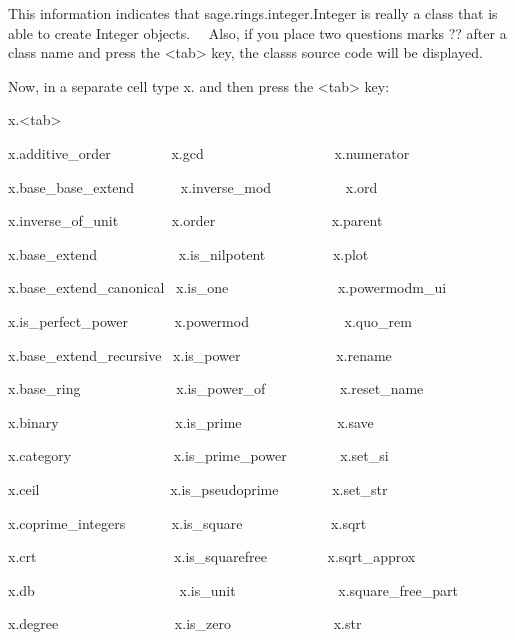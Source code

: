 \documentclass[12pt,twoside]{book}
\begin{document}
\bigskip

This information indicates that sage.rings.integer.Integer is really a
class that is able to create Integer objects. \ \ Also, if you place
two questions marks {\textquotesingle}??{\textquotesingle} after a
class name and press the {\textless}tab{\textgreater} key, the
class{\textquotesingle}s source code will be displayed.


\bigskip

Now, in a separate cell type x. and then press the
{\textless}tab{\textgreater} key:


\bigskip

x.{\textless}tab{\textgreater}

{\textbar}

x.additive\_order \ \ \ \ \ \ \ \ x.gcd
\ \ \ \ \ \ \ \ \ \ \ \ \ \ \ \ \ \ x.numerator

x.base\_base\_extend \ \ \ \ \ \ x.inverse\_mod
\ \ \ \ \ \ \ \ \ \ x.ord

x.inverse\_of\_unit \ \ \ \ \ \ \ x.order
\ \ \ \ \ \ \ \ \ \ \ \ \ \ \ \ x.parent

x.base\_extend \ \ \ \ \ \ \ \ \ \ \ x.is\_nilpotent
\ \ \ \ \ \ \ \ \ x.plot

x.base\_extend\_canonical \ x.is\_one
\ \ \ \ \ \ \ \ \ \ \ \ \ \ \ x.powermodm\_ui

x.is\_perfect\_power \ \ \ \ \ \ x.powermod
\ \ \ \ \ \ \ \ \ \ \ \ \ x.quo\_rem

x.base\_extend\_recursive \ x.is\_power
\ \ \ \ \ \ \ \ \ \ \ \ \ x.rename

x.base\_ring \ \ \ \ \ \ \ \ \ \ \ \ \ x.is\_power\_of
\ \ \ \ \ \ \ \ \ \ x.reset\_name

x.binary \ \ \ \ \ \ \ \ \ \ \ \ \ \ \ \ x.is\_prime
\ \ \ \ \ \ \ \ \ \ \ \ \ x.save

x.category \ \ \ \ \ \ \ \ \ \ \ \ \ \ x.is\_prime\_power
\ \ \ \ \ \ \ x.set\_si

x.ceil \ \ \ \ \ \ \ \ \ \ \ \ \ \ \ \ \ \ x.is\_pseudoprime
\ \ \ \ \ \ \ x.set\_str

x.coprime\_integers \ \ \ \ \ \ x.is\_square
\ \ \ \ \ \ \ \ \ \ \ \ x.sqrt

x.crt \ \ \ \ \ \ \ \ \ \ \ \ \ \ \ \ \ \ \ x.is\_squarefree
\ \ \ \ \ \ \ \ x.sqrt\_approx

x.db \ \ \ \ \ \ \ \ \ \ \ \ \ \ \ \ \ \ \ \ x.is\_unit
\ \ \ \ \ \ \ \ \ \ \ \ \ \ x.square\_free\_part

x.degree \ \ \ \ \ \ \ \ \ \ \ \ \ \ \ \ x.is\_zero
\ \ \ \ \ \ \ \ \ \ \ \ \ \ x.str
\end{document}
